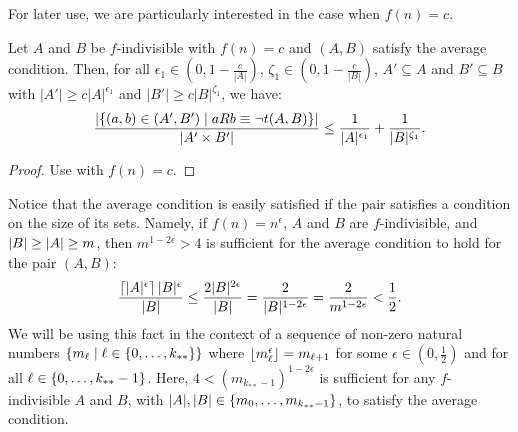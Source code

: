         For later use, we are particularly interested in the case when $f(n) = c$.

        \begin{corollary} \label{cor:exceptions_bound_of_c_indivisible_sets}
            Let $A$ and $B$ be $f$-indivisible with $f(n) = c$ and $(A,B)$ satisfy the average condition.
            Then, for all $\epsilon_1 \in (0, 1 - \frac{c}{|A|})$, $\zeta_1 \in (0, 1 - \frac{c}{|B|})$, $A' \subseteq A$ and
            $B' \subseteq B$ with $|A'| \geq c |A|^{\epsilon_1}$ and $|B'| \geq c |B|^{\zeta_1}$, we have:
            \[
                \frac{|\{ (a,b) \in (A',B') \mid a R b \equiv \neg t(A,B) \}|}{|A' \times B'|} \leq
                    \frac{1}{|A|^{\epsilon_1}} + \frac{1}{|B|^{\zeta_1}}.
            \]
            \begin{proof}
                Use  with $f(n) = c$.
            \end{proof}
        \end{corollary}

        \begin{remark} \label{rmk:sufficient_requirement_for_average_condition}
            Notice that the average condition is easily satisfied if the pair satisfies a condition on the size of its sets.
            Namely, if $f(n) = n^\epsilon$, $A$ and $B$ are $f$-indivisible, and $| B | \geq | A | \geq m$,
            then $m^{1-2\epsilon} > 4$ is sufficient for the average condition to hold for the pair $(A,B)$:
            \[
                \frac{\left\lceil |A|^\epsilon \right\rceil |B|^\epsilon}{|B|}
                    \leq \frac{2|B|^{2\epsilon}}{|B|}
                    = \frac{2}{|B|^{1-2\epsilon}}
                    = \frac{2}{m^{1-2\epsilon}}
                    < \frac{1}{2}.
            \]
            We will be using this fact in the context of a sequence of non-zero natural numbers
            $\{ m_\ell \mid \ell \in \{ 0, \dots, k_{**} \} \}$ where $\left\lfloor m_\ell^\epsilon \right\rfloor = m_{\ell+1}$
            for some $\epsilon \in (0, \frac{1}{2})$ and for all $\ell \in \{ 0, \dots, k_{**}-1 \}$.
            Here, $4 < (m_{k_{**}-1})^{1-2\epsilon}$ is sufficient for any $f$-indivisible $A$ and $B$, with
            $|A|, |B| \in \{ m_0, \dots, m_{k_{**}-1} \}$, to satisfy the average condition.
        \end{remark}

